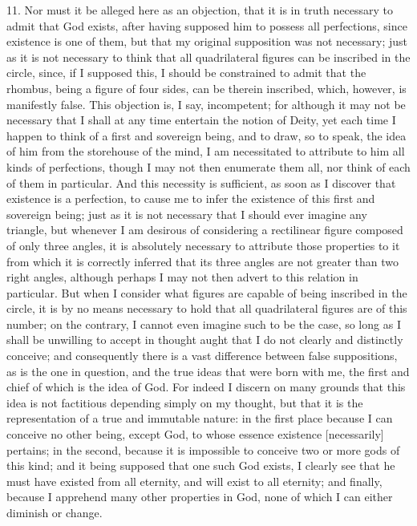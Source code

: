 11. Nor must it be alleged here as an objection, that it is in truth necessary to admit that God exists, after having supposed him to possess all perfections, since existence is one of them, but that my original supposition was not necessary; just as it is not necessary to think that all quadrilateral figures can be inscribed in the circle, since, if I supposed this, I should be constrained to admit that the rhombus, being a figure of four sides, can be therein inscribed, which, however, is manifestly false. This objection is, I say, incompetent; for although it may not be necessary that I shall at any time entertain the notion of Deity, yet each time I happen to think of a first and sovereign being, and to draw, so to speak, the idea of him from the storehouse of the mind, I am necessitated to attribute to him all kinds of perfections, though I may not then enumerate them all, nor think of each of them in particular. And this necessity is sufficient, as soon as I discover that existence is a perfection, to cause me to infer the existence of this first and sovereign being; just as it is not necessary that I should ever imagine any triangle, but whenever I am desirous of considering a rectilinear figure composed of only three angles, it is absolutely necessary to attribute those properties to it from which it is correctly inferred that its three angles are not greater than two right angles, although perhaps I may not then advert to this relation in particular. But when I consider what figures are capable of being inscribed in the circle, it is by no means necessary to hold that all quadrilateral figures are of this number; on the contrary, I cannot even imagine such to be the case, so long as I shall be unwilling to accept in thought aught that I do not clearly and distinctly conceive; and consequently there is a vast difference between false suppositions, as is the one in question, and the true ideas that were born with me, the first and chief of which is the idea of God. For indeed I discern on many grounds that this idea is not factitious depending simply on my thought, but that it is the representation of a true and immutable nature: in the first place because I can conceive no other being, except God, to whose essence existence [necessarily] pertains; in the second, because it is impossible to conceive two or more gods of this kind; and it being supposed that one such God exists, I clearly see that he must have existed from all eternity, and will exist to all eternity; and finally, because I apprehend many other properties in God, none of which I can either diminish or change.

